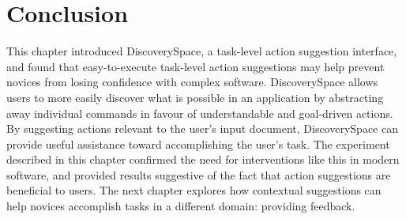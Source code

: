\section{Conclusion}
This chapter introduced Discovery\-Space, a task-level action suggestion interface, and found that easy-to-execute task-level action suggestions may help prevent novices from losing confidence with complex software. Discovery\-Space allows users to more easily discover what is possible in an application by abstracting away individual commands in favour of understandable and goal-driven actions. By suggesting actions relevant to the user's input document, Discovery\-Space can provide useful assistance toward accomplishing the user's task. The experiment described in this chapter confirmed the need for interventions like this in modern software, and provided results suggestive of the fact that action suggestions are beneficial to users. The next chapter explores how contextual suggestions can help novices accomplish tasks in a different domain: providing feedback.